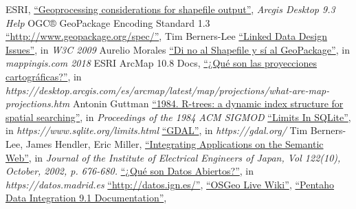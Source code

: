 \begin{thebibliography}{99}
     ESRI, 
        \href{http://webhelp.esri.com/arcgisdesktop/9.3/index.cfm?TopicName=Geoprocessing\%20considerations\%20for\%20shapefile\%20output}{``Geoprocessing considerations for shapefile output''},
        \textit{Arcgis Desktop 9.3 Help}
    OGC® GeoPackage Encoding Standard 1.3
        \href{http://www.geopackage.org/spec/}{``http://www.geopackage.org/spec/''},
     Tim Berners-Lee 
        \href{https://www.w3.org/DesignIssues/LinkedData.html}{``Linked Data Design Issues''},
        in \textit{W3C 2009}
     Aurelio Morales
        \href{https://mappinggis.com/2018/08/di-no-al-shapefile-y-si-al-geopackage/}{``Di no al Shapefile y sí al GeoPackage''},
        in \textit{mappingis.com 2018}
     ESRI ArcMap 10.8 Docs,
        \href{https://desktop.arcgis.com/es/arcmap/latest/map/projections/what-are-map-projections.htm}{``¿Qué son las proyecciones cartográficas?''},
        in \textit{https://desktop.arcgis.com/es/arcmap/latest/map/projections/what-are-map-projections.htm}
     Antonin Guttman
        \href{https://dl.acm.org/doi/10.1145/602259.602266}{``1984. R-trees: a dynamic index structure for spatial searching''},
        in \textit{Proceedings of the 1984 ACM SIGMOD }
        \href{https://www.sqlite.org/limits.html}{``Limits In SQLite''},
        in \textit{https://www.sqlite.org/limits.html}
        \href{https://gdal.org/}{``GDAL''},
        in \textit{https://gdal.org/}
     Tim Berners-Lee, James Hendler, Eric Miller,
        \href{https://www.w3.org/2002/07/swint}{``Integrating Applications on the Semantic Web''},
        in \textit{Journal of the Institute of Electrical Engineers of Japan, Vol 122(10), October, 2002, p. 676-680.}
        \href{https://datos.madrid.es/portal/site/egob/menuitem.400a817358ce98c34e937436a8a409a0/?vgnextoid=eba412b9ace9f310VgnVCM100000171f5a0aRCRD&vgnextchannel=eba412b9ace9f310VgnVCM100000171f5a0aRCRD&vgnextfmt=default}{``¿Qué son Datos Abiertos?''},
        in \textit{https://datos.madrid.es}
        \href{http://datos.ign.es/}{``http://datos.ign.es/''},
        \href{https://live.osgeo.org/archive/10.0/es/overview/geokettle\_overview.html}{``OSGeo Live Wiki''},
        \href{https://help.pentaho.com/Documentation/9.1/Products/Pentaho\_Data\_Integration}{``Pentaho Data
        Integration 9.1 Documentation''},

\end{thebibliography}

